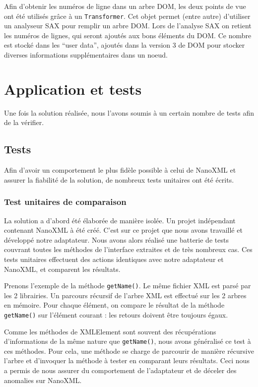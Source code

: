 Afin d'obtenir les numéros de ligne dans un arbre DOM, les deux points de vue ont été utilisés grâce à un \verb|Transformer|.
Cet objet permet (entre autre) d'utiliser un analyseur SAX pour remplir un arbre DOM.
Lors de l'analyse SAX on retient les numéros de lignes, qui seront ajoutés aux bons éléments du DOM.
Ce nombre est stocké dans les ``user data'', ajoutés dans la version 3  de DOM pour stocker diverses informations supplémentaires dans un noeud.

\section{Application et tests}
Une fois la solution réalisée, nous l'avons soumis à un certain nombre de tests afin de la vérifier.
\subsection{Tests}
Afin d'avoir un comportement le plus fidèle possible à celui de NanoXML et assurer la fiabilité de la solution, de nombreux tests unitaires ont été écrits.
\subsubsection{Test unitaires de comparaison}
La solution a d'abord été élaborée de manière isolée.
Un projet indépendant contenant NanoXML à été créé.
C'est sur ce projet que nous avons travaillé et développé notre adaptateur.
Nous avons alors réalisé une batterie de tests couvrant toutes les méthodes de l'interface extraites et de très nombreux cas.
Ces tests unitaires effectuent des actions identiques avec notre adaptateur et NanoXML, et comparent les résultats.

Prenons l'exemple de la méthode \verb|getName()|. Le même fichier XML est parsé par les 2 librairies.
Un parcours récursif de l'arbre XML est effectué sur les 2 arbres en mémoire.
Pour chaque élément, on compare le résultat de la méthode \verb|getName()| sur l'élément courant : les retours doivent être toujours égaux.

Comme les méthodes de XMLElement sont souvent des récupérations d'informations de la même nature que \verb|getName()|, nous avons généralisé ce test à ces méthodes.
Pour cela, une méthode se charge de parcourir de manière récursive l'arbre et d'invoquer la méthode à tester en comparant leurs résultats.
Ceci nous a permis de nous assurer du comportement de l'adaptateur et de déceler des anomalies sur NanoXML.


